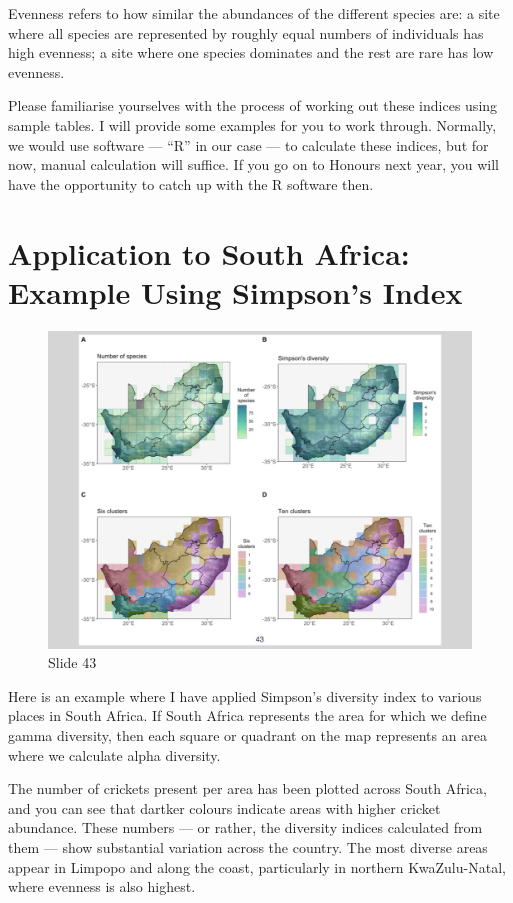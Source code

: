 \documentclass[
  12pt,
]{book}
\begin{document}
Evenness refers to how similar the abundances of the different species
are: a site where all species are represented by roughly equal numbers
of individuals has high evenness; a site where one species dominates and
the rest are rare has low evenness.

Please familiarise yourselves with the process of working out these
indices using sample tables. I will provide some examples for you to
work through. Normally, we would use software --- ``R'' in our case ---
to calculate these indices, but for now, manual calculation will
suffice. If you go on to Honours next year, you will have the
opportunity to catch up with the R software then.

\section{Application to South Africa: Example Using Simpson's
Index}\label{application-to-south-africa-example-using-simpsons-index}

\begin{figure}[ht]
\centering
\includegraphics[width=0.8\linewidth]{../images/BDC334/BDC334-043.jpeg}
\caption*{Slide 43}
\end{figure}

Here is an example where I have applied Simpson's diversity index to
various places in South Africa. If South Africa represents the area for
which we define gamma diversity, then each square or quadrant on the map
represents an area where we calculate alpha diversity.

The number of crickets present per area has been plotted across South
Africa, and you can see that dartker colours indicate areas with higher
cricket abundance. These numbers --- or rather, the diversity indices
calculated from them --- show substantial variation across the country.
The most diverse areas appear in Limpopo and along the coast,
particularly in northern KwaZulu-Natal, where evenness is also highest.
\end{document}

